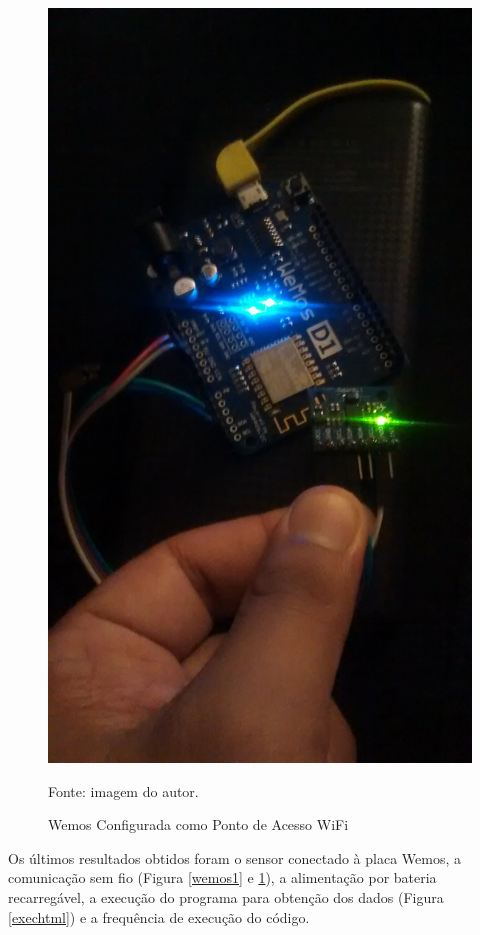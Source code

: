	\begin{figure}[h]
		\centering
		\includegraphics[keepaspectratio=true,scale=0.075]{figuras/wemos2.jpg}
		\caption{Wemos Configurada como Ponto de Acesso WiFi}
		\footnotesize Fonte: imagem do autor. 
		\label{wemos2}	
	\end{figure}
	
	Os últimos resultados obtidos foram o sensor conectado à placa Wemos, a comunicação sem fio (Figura \ref{wemos1} e \ref{wemos2}), a alimentação por bateria recarregável, a execução do programa para obtenção dos dados (Figura \ref{exechtml}) e a frequência de execução do código.
	
